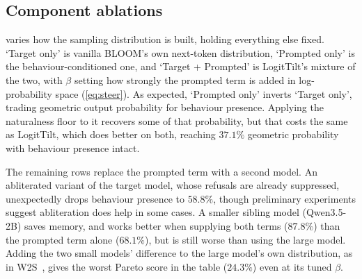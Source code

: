 \documentclass{article}
\theoremstyle{plain}
\theoremstyle{definition}
\theoremstyle{remark}
\begin{document}
\begin{table}[t]
  \centering
  \small
  \setlength{\tabcolsep}{5pt}
  \caption{\textbf{LogitTilt's elicitation is stable across which model generates BLOOM's inputs and which scores the transcripts.} The auditor is split into a \emph{generator} (produces scenarios and inputs) and a \emph{judge} (scores presence), each set to Gemma-4-26B-A4B or Claude-Sonnet-4.6. Row 1 corresponds to the default setup used throughout the paper.}
  \label{tab:auditor}
\end{table}





\subsection{Component ablations}

 varies how the sampling distribution is built, holding everything else fixed. `Target only' is vanilla BLOOM's own next-token distribution, `Prompted only' is the behaviour-conditioned one, and `Target + Prompted' is LogitTilt's mixture of the two, with $\beta$ setting how strongly the prompted term is added in log-probability space (\cref{eq:steer}). As expected, `Prompted only' inverts `Target only', trading geometric output probability for behaviour presence. Applying the naturalness floor to it recovers some of that probability, but that costs the same as LogitTilt, which does better on both, reaching $37.1\%$ geometric probability with behaviour presence intact.

The remaining rows replace the prompted term with a second model. An abliterated variant of the target model, whose refusals are already suppressed, unexpectedly drops behaviour presence to $58.8\%$, though preliminary experiments suggest abliteration does help in some cases. A smaller sibling model (Qwen3.5-2B) saves memory, and works better when supplying both terms ($87.8\%$) than the prompted term alone ($68.1\%$), but is still worse than using the large model. Adding the two small models' difference to the large model's own distribution, as in W2S~\citep{zhao2024weak}, gives the worst Pareto score in the table ($24.3\%$) even at its tuned $\beta$.
\end{document}
